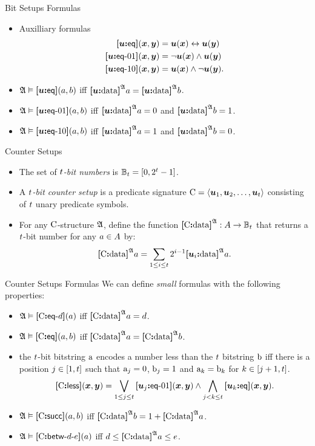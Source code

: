 \documentclass{beamer}
\begin{document}
\begin{frame}{Bit Setups Formulas}
\begin{itemize}
  \item Auxilliary formulas
  \begin{align*}
    \feq\su(\xx,\yy) &= \su(\xx) \lequ \su(\yy) \\
    \feqOI\su(\xx,\yy) &= \lnot \su(\xx) \land \su(\yy) \\
    \feqIO\su(\xx,\yy) &= \su(\xx) \land \lnot \su(\yy). \\
  \end{align*}
  \item $\StrA\vDash\feq\su(\ea,\eb)$ iff $\data\su\StrA\ea = \data\su\StrA\eb$.
  \item $\StrA\vDash\feqOI\su(\ea,\eb)$ iff $\data\su\StrA\ea = 0$ and
  $\data\su\StrA\eb = 1$.
  \item $\StrA\vDash\feqIO\su(\ea,\eb)$ iff $\data\su\StrA\ea = 1$ and
  $\data\su\StrA\eb = 0$.
\end{itemize}
\end{frame}

\begin{frame}{Counter Setups}
\begin{itemize}
  \item The set of \emph{$\tbit$-bit numbers} is $\Bitnumst = [0, 2^\tbit-1]$.
  \item A \emph{$\tbit$-bit counter setup} is a predicate signature $\CS =
  \seq{\suu1,\suu2,\dots,\suu\tbit}$ consisting of $\tbit$ unary predicate
  symbols.
  \item For any $\CS$-structure $\StrA$, define the function $\data\CS\StrA :
  \domA \to \Bitnumst$ that returns a $\tbit$-bit number for any
  $\ea\in\domA$ by:
  \[
    \data\CS\StrA\ea = \sum_{1 \leq \ii \leq \tbit} 2^{\ii-1} 
    \data{\suu\ii}\StrA\ea.
  \]
\end{itemize}
\end{frame}

\begin{frame}{Counter Setups Formulas}
We can define \emph{small} formulas with the following properties:
\begin{itemize}
  \item $\StrA\vDash\feqA\CS\datad(\ea)$ iff $\data\CS\StrA\ea = \datad$.
  \item $\StrA\vDash\feq\CS(\ea,\eb)$ iff $\data\CS\StrA\ea = \data\CS\StrA\eb$.
  \item the $\tbit$-bit bitstring $\bstra$ encodes a number less than the
  $\tbit$ bitstring $\bstrb$ iff there is a position $\jj\in[1,\tbit]$ such that
  $\bstra_j = 0$, $\bstrb_j = 1$ and $\bstra_k = \bstrb_k$ for
  $k\in[j+1,\tbit]$.
  \[
    \fless\CS(\xx,\yy) = \bigvee_{1 \leq \jj \leq \tbit} \feqOI{\suu\jj}(\xx,\yy)
    \land \bigwedge_{\jj < \kk \leq \tbit} \feq{\suu\kk}(\xx,\yy).
  \]
  \item $\StrA\vDash\fsucc\CS(\ea,\eb)$ iff $\data\CS\StrA\eb = 1 +
  \data\CS\StrA\ea$.
  \item
  $\StrA \vDash \fbetw\CS\datad\datae(\ea)$ iff
  $\datad \leq \data\CS\StrA\ea \leq \datae$.
\end{itemize}
\end{frame}
\end{document}
